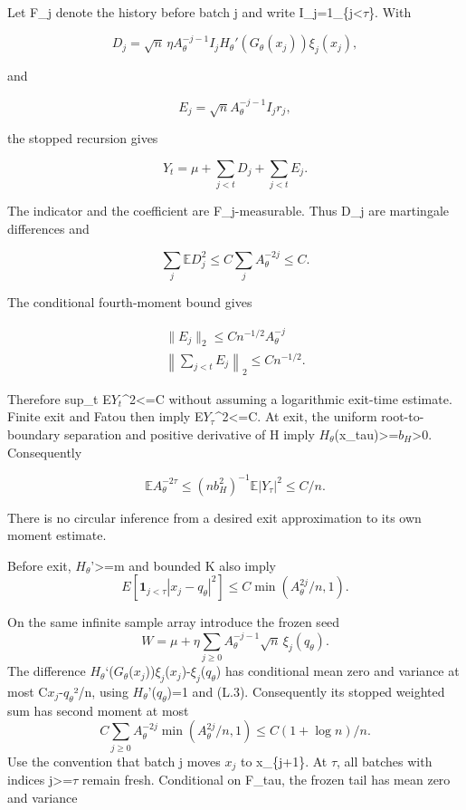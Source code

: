 Let F\_j denote the history before batch j and write I\_j=1\_\{j\textless{}\(\tau\)\}. With

\[
D_j=\sqrt n\,\eta A_\theta^{-j-1} I_j
 H_\theta'(G_\theta(x_j))\xi_j(x_j),
\]

and

\[
E_j=\sqrt n A_\theta^{-j-1}I_j r_j,
\]

the stopped recursion gives

\[
Y_t=\mu+\sum_{j<t}D_j+\sum_{j<t}E_j.
\]

The indicator and the coefficient are F\_j-measurable. Thus D\_j are martingale differences and

\[
\sum_j\mathbb E D_j^2\le C\sum_j A_\theta^{-2j}\le C.
\]

The conditional fourth-moment bound gives

\[
\begin{gathered}
\|E_j\|_2\le C n^{-1/2}A_\theta^{-j} \\
\left\|\sum_{j<t}E_j\right\|_2\le Cn^{-1/2}.
\end{gathered}
\]

Therefore sup\_t E\textbar{}\(Y_t\)\textbar\^{}2\textless=C without assuming a logarithmic exit-time estimate. Finite exit and Fatou then imply E\textbar{}\(Y_\tau\)\textbar\^{}2\textless=C. At exit, the uniform root-to-boundary separation and positive derivative of H imply \textbar{}\(H_\theta\)(x\_tau)\textbar\textgreater=\(b_H\)\textgreater0. Consequently

\[
\mathbb E A_\theta^{-2\tau}\le (nb_H^2)^{-1}\mathbb E|Y_\tau|^2\le C/n.
\]

There is no circular inference from a desired exit approximation to its own moment estimate.

Before exit, \(H_\theta\)'\textgreater=m and bounded K also imply
\[
E[\mathbf1_{j<\tau}|x_j-q_\theta|^2]\le C\min(A_\theta^{2j}/n,1).
\tag{L.4}
\]

On the same infinite sample array introduce the frozen seed
\[
W=\mu+\eta\sum_{j\ge0}A_\theta^{-j-1}\sqrt n\,\xi_j(q_\theta).
\]
The difference \(H_\theta\)`(\(G_\theta\)(\(x_j\)))\(\xi_j\)(\(x_j\))-\(\xi_j\)(\(q_\theta\)) has conditional mean zero and variance at most C\textbar{}\(x_j\)-\(q_\theta\)\textbar²/n, using \(H_\theta\)'(\(q_\theta\))=1 and (L.3). Consequently its stopped weighted sum has second moment at most
\[
C\sum_{j\ge0}A_\theta^{-2j}\min(A_\theta^{2j}/n,1)
\le C(1+\log n)/n.
\]
Use the convention that batch j moves \(x_j\) to x\_\{j+1\}. At \(\tau\), all batches with indices j\textgreater=\(\tau\) remain fresh. Conditional on F\_tau, the frozen tail has mean zero and variance

